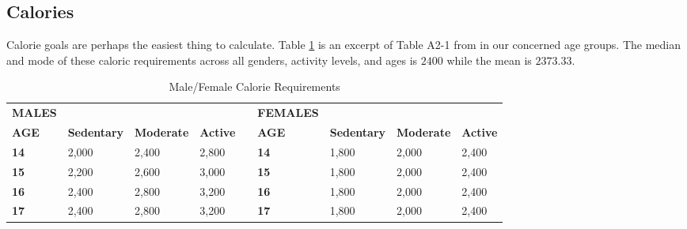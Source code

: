 \documentclass[letterpaper,oneside,12pt]{report}
\begin{document}
\subsection{Calories}\label{Calories}
Calorie goals are perhaps the easiest thing to calculate. Table \ref{CalorieReq} is an excerpt of Table A2-1 from \cite{USDAHHKA} in our concerned age groups. The median and mode of these caloric requirements across all genders, activity levels, and ages is $2400$ while the mean is $2373.33$.

\begin{table}
\centering
\caption{Male/Female Calorie Requirements}
\label{CalorieReq}
\begin{tabular}{@{}|l|llll|l|lll@{}}
\cmidrule(r){1-1} \cmidrule(lr){6-6}
\textbf{MALES} &                                         &                                        &                                      &  & \textbf{FEMALES} &                                         &                                        &                                      \\ \cmidrule(r){1-4} \cmidrule(l){6-9} 
\textbf{AGE}   & \multicolumn{1}{l|}{\textbf{Sedentary}} & \multicolumn{1}{l|}{\textbf{Moderate}} & \multicolumn{1}{l|}{\textbf{Active}} &  & \textbf{AGE}     & \multicolumn{1}{l|}{\textbf{Sedentary}} & \multicolumn{1}{l|}{\textbf{Moderate}} & \multicolumn{1}{l|}{\textbf{Active}} \\ \cmidrule(r){1-4} \cmidrule(l){6-9} 
\textbf{14}    & \multicolumn{1}{l|}{2,000}              & \multicolumn{1}{l|}{2,400}             & \multicolumn{1}{l|}{2,800}           &  & \textbf{14}      & \multicolumn{1}{l|}{1,800}              & \multicolumn{1}{l|}{2,000}             & \multicolumn{1}{l|}{2,400}           \\ \cmidrule(r){1-4} \cmidrule(l){6-9} 
\textbf{15}    & \multicolumn{1}{l|}{2,200}              & \multicolumn{1}{l|}{2,600}             & \multicolumn{1}{l|}{3,000}           &  & \textbf{15}      & \multicolumn{1}{l|}{1,800}              & \multicolumn{1}{l|}{2,000}             & \multicolumn{1}{l|}{2,400}           \\ \cmidrule(r){1-4} \cmidrule(l){6-9} 
\textbf{16}    & \multicolumn{1}{l|}{2,400}              & \multicolumn{1}{l|}{2,800}             & \multicolumn{1}{l|}{3,200}           &  & \textbf{16}      & \multicolumn{1}{l|}{1,800}              & \multicolumn{1}{l|}{2,000}             & \multicolumn{1}{l|}{2,400}           \\ \cmidrule(r){1-4} \cmidrule(l){6-9} 
\textbf{17}    & \multicolumn{1}{l|}{2,400}              & \multicolumn{1}{l|}{2,800}             & \multicolumn{1}{l|}{3,200}           &  & \textbf{17}      & \multicolumn{1}{l|}{1,800}              & \multicolumn{1}{l|}{2,000}             & \multicolumn{1}{l|}{2,400}           \\ \cmidrule(r){1-4} \cmidrule(l){6-9} 

\end{tabular}
\end{table}
\end{document}
